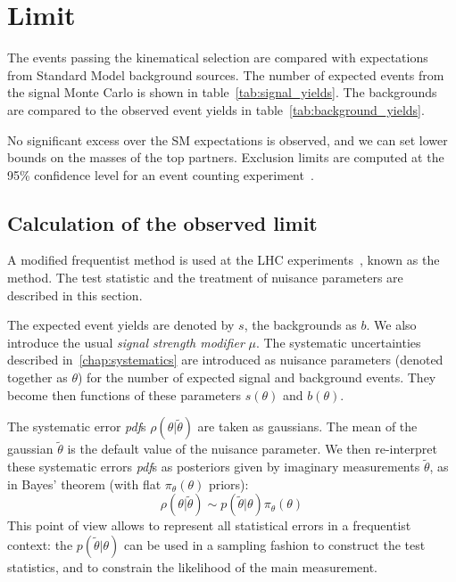 \chapter{Limit}
The events passing the kinematical selection are compared with expectations
from Standard Model background sources. The number of expected events from
the signal Monte Carlo is shown in table~\ref{tab:signal_yields}. The
backgrounds are compared to the observed event yields in
table~\ref{tab:background_yields}.


No significant excess over the SM expectations is observed, and we can set
lower bounds on the masses of the top partners.
Exclusion limits are computed at the 95\% confidence level for an event
counting experiment~\cite{2010acat.confE..57M}.

\section{Calculation of the observed limit}
A modified frequentist method is used at the LHC
experiments~\cite{ATLAS:1379837}, known as the \CLs method.
The test statistic and the treatment of nuisance parameters are described in
this section.

The expected \TP event yields are denoted by $s$, the backgrounds as
$b$. We also introduce the usual \emph{signal strength modifier} $\mu$.
The systematic uncertainties described in~\ref{chap:systematics} are
introduced as nuisance parameters (denoted together as $\theta$) for the number of expected signal and
background events. They become then functions of these parameters
$s(\theta)$ and $b(\theta)$.

The systematic error \emph{pdf}s $\rho(\theta | \tilde\theta)$ are taken as
gaussians. The mean of the gaussian $\tilde \theta$ is the default value of
the nuisance parameter.
We then re-interpret these systematic errors \emph{pdf}s as posteriors given
by imaginary measurements $\tilde \theta$, as in Bayes' theorem (with flat
$\pi_\theta(\theta)$ priors):
\begin{equation*}
    \rho(\theta|\tilde \theta) \sim p(\tilde \theta | \theta)
    \pi_\theta(\theta)
\end{equation*}
This point of view allows to represent all statistical errors in a
frequentist context: the $p(\tilde \theta|\theta)$ can be used in a sampling
fashion to construct the test statistics, and to constrain the likelihood of
the main measurement.


